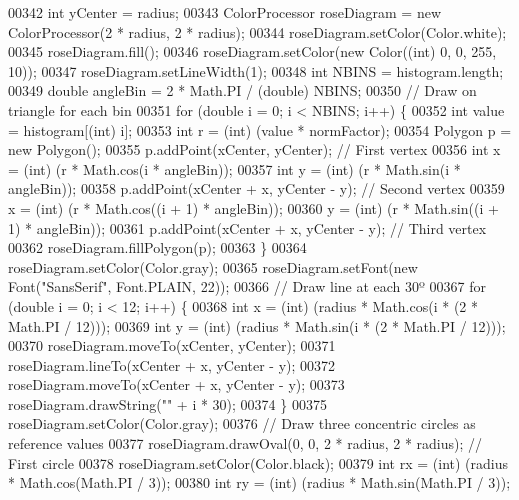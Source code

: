 \begin{DoxyCode}
00342     \textcolor{keywordtype}{int} yCenter = radius;
00343     ColorProcessor roseDiagram = \textcolor{keyword}{new} ColorProcessor(2 * radius, 2 * radius);
00344     roseDiagram.setColor(Color.white);
00345     roseDiagram.fill();
00346     roseDiagram.setColor(\textcolor{keyword}{new} Color((\textcolor{keywordtype}{int}) 0, 0, 255, 10));
00347     roseDiagram.setLineWidth(1);
00348     \textcolor{keywordtype}{int} NBINS = histogram.length;
00349     \textcolor{keywordtype}{double} angleBin = 2 * Math.PI / (double) NBINS;
00350     \textcolor{comment}{// Draw on triangle for each bin}
00351     \textcolor{keywordflow}{for} (\textcolor{keywordtype}{double} i = 0; i < NBINS; i++) \{
00352       \textcolor{keywordtype}{int} value = histogram[(int) i];
00353       \textcolor{keywordtype}{int} r = (int) (value * normFactor);
00354       Polygon p = \textcolor{keyword}{new} Polygon();
00355       p.addPoint(xCenter, yCenter); \textcolor{comment}{// First vertex}
00356       \textcolor{keywordtype}{int} x = (int) (r * Math.cos(i * angleBin));
00357       \textcolor{keywordtype}{int} y = (int) (r * Math.sin(i * angleBin));
00358       p.addPoint(xCenter + x, yCenter - y); \textcolor{comment}{// Second vertex}
00359       x = (int) (r * Math.cos((i + 1) * angleBin));
00360       y = (int) (r * Math.sin((i + 1) * angleBin));
00361       p.addPoint(xCenter + x, yCenter - y); \textcolor{comment}{// Third vertex}
00362       roseDiagram.fillPolygon(p);
00363     \}
00364     roseDiagram.setColor(Color.gray);
00365     roseDiagram.setFont(\textcolor{keyword}{new} Font(\textcolor{stringliteral}{"SansSerif"}, Font.PLAIN, 22));
00366     \textcolor{comment}{// Draw line at each 30º}
00367     \textcolor{keywordflow}{for} (\textcolor{keywordtype}{double} i = 0; i < 12; i++) \{
00368       \textcolor{keywordtype}{int} x = (int) (radius * Math.cos(i * (2 * Math.PI / 12)));
00369       \textcolor{keywordtype}{int} y = (int) (radius * Math.sin(i * (2 * Math.PI / 12)));
00370       roseDiagram.moveTo(xCenter, yCenter);
00371       roseDiagram.lineTo(xCenter + x, yCenter - y);
00372       roseDiagram.moveTo(xCenter + x, yCenter - y);
00373       roseDiagram.drawString(\textcolor{stringliteral}{""} + i * 30);
00374     \}
00375     roseDiagram.setColor(Color.gray);
00376     \textcolor{comment}{// Draw three concentric circles as reference values}
00377     roseDiagram.drawOval(0, 0, 2 * radius, 2 * radius); \textcolor{comment}{// First circle}
00378     roseDiagram.setColor(Color.black);
00379     \textcolor{keywordtype}{int} rx = (int) (radius * Math.cos(Math.PI / 3));
00380     \textcolor{keywordtype}{int} ry = (int) (radius * Math.sin(Math.PI / 3));

\end{DoxyCode}
